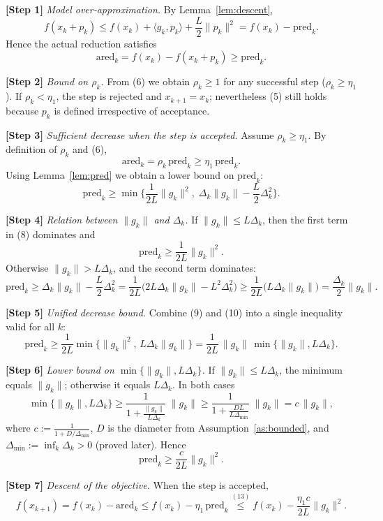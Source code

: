 \documentclass{article}
\begin{document}
\noindent\textbf{[Step 1]} \emph{Model over‑approximation.}  
By Lemma~\ref{lem:descent},
\[
f(x_k+p_k)\le f(x_k)+\langle g_k,p_k\rangle+\frac{L}{2}\|p_k\|^2
= f(x_k)-\text{pred}_k.
\tag{5}
\]
Hence the actual reduction satisfies
\[
\text{ared}_k = f(x_k)-f(x_k+p_k)\ge \text{pred}_k.
\tag{6}
\]

\noindent\textbf{[Step 2]} \emph{Bound on $\rho_k$.}  
From (6) we obtain $\rho_k\ge 1$ for any successful step ($\rho_k\ge\eta_1$).  
If $\rho_k<\eta_1$, the step is rejected and $x_{k+1}=x_k$; nevertheless (5) still holds because $p_k$ is defined irrespective of acceptance.

\noindent\textbf{[Step 3]} \emph{Sufficient decrease when the step is accepted.}  
Assume $\rho_k\ge\eta_1$. By definition of $\rho_k$ and (6),
\[
\text{ared}_k = \rho_k\,\text{pred}_k \ge \eta_1\,\text{pred}_k.
\tag{7}
\]
Using Lemma~\ref{lem:pred} we obtain a lower bound on $\text{pred}_k$:
\[
\text{pred}_k\ge \min\!\Big\{\frac{1}{2L}\|g_k\|^2,\;\Delta_k\|g_k\|-\frac{L}{2}\Delta_k^2\Big\}.
\tag{8}
\]

\noindent\textbf{[Step 4]} \emph{Relation between $\|g_k\|$ and $\Delta_k$.}  
If $\|g_k\|\le L\Delta_k$, then the first term in (8) dominates and
\[
\text{pred}_k\ge \frac{1}{2L}\|g_k\|^2.
\tag{9}
\]
Otherwise $\|g_k\|>L\Delta_k$, and the second term dominates:
\[
\text{pred}_k\ge \Delta_k\|g_k\|-\frac{L}{2}\Delta_k^2
= \frac{1}{2L}\bigl(2L\Delta_k\|g_k\|-L^2\Delta_k^2\bigr)
\ge \frac{1}{2L}\bigl(L\Delta_k\|g_k\|\bigr)
= \frac{\Delta_k}{2}\|g_k\|.
\tag{10}
\]

\noindent\textbf{[Step 5]} \emph{Unified decrease bound.}  
Combine (9) and (10) into a single inequality valid for all $k$:
\[
\text{pred}_k\ge \frac{1}{2L}\min\bigl\{\|g_k\|^2,\,L\Delta_k\|g_k\|\bigr\}
= \frac{1}{2L}\,\|g_k\|\,\min\{\|g_k\|,L\Delta_k\}.
\tag{11}
\]

\noindent\textbf{[Step 6]} \emph{Lower bound on $\min\{\|g_k\|,L\Delta_k\}$.}  
If $\|g_k\|\le L\Delta_k$, the minimum equals $\|g_k\|$; otherwise it equals $L\Delta_k$. In both cases
\[
\min\{\|g_k\|,L\Delta_k\}\ge \frac{1}{1+\frac{\|g_k\|}{L\Delta_k}}\;\|g_k\|
\ge \frac{1}{1+ \frac{D L}{L\Delta_{\min}}}\;\|g_k\|
= c\,\|g_k\|,
\tag{12}
\]
where $c:=\frac{1}{1+ D/\Delta_{\min}}$, $D$ is the diameter from Assumption~\ref{as:bounded}, and $\Delta_{\min}:=\inf_k\Delta_k>0$ (proved later). Hence
\[
\text{pred}_k\ge \frac{c}{2L}\|g_k\|^2.
\tag{13}
\]

\noindent\textbf{[Step 7]} \emph{Descent of the objective.}  
When the step is accepted,
\[
f(x_{k+1}) = f(x_k)-\text{ared}_k
\le f(x_k)-\eta_1\,\text{pred}_k
\stackrel{(13)}{\le} f(x_k)-\frac{\eta_1c}{2L}\|g_k\|^2.
\tag{14}
\]
\end{document}
